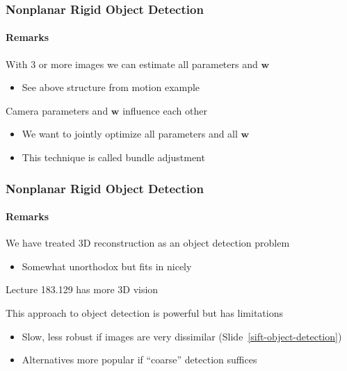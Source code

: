 \documentclass[xetex,professionalfont]{beamer}
\renewcommand{\vec}[1]{\ensuremath{\mathbf{#1}}}
\newcommand{\vw}{\vec{w}}
\renewcommand\emph[1]{\textcolor{tuwcvl_inf_red}{#1}}
\begin{document}
\begin{frame}
\frametitle{Nonplanar Rigid Object Detection}
\framesubtitle{Remarks}

With 3 or more images we can estimate all parameters and $\vw$ %
\begin{itemize}
    \item See above structure from motion example
\end{itemize}

\bigskip
Camera parameters and $\vw$ influence each other
\begin{itemize}
    \item We want to jointly optimize all parameters and all $\vw$
    \item This technique is called \emph{bundle adjustment}
\end{itemize}

\end{frame}


\begin{frame}
\frametitle{Nonplanar Rigid Object Detection}
\framesubtitle{Remarks}

We have treated 3D reconstruction as an object detection problem
\begin{itemize}
    \item Somewhat unorthodox but fits in nicely
\end{itemize}

\bigskip
Lecture 183.129 has more 3D vision

\bigskip
This approach to object detection is powerful but has limitations
\begin{itemize}
    \item Slow, less robust if images are very dissimilar (Slide~\ref{sift-object-detection})
    \item Alternatives more popular if \enquote{coarse} detection suffices %
\end{itemize}

\end{frame}


{
\begin{frame}


\end{frame}
}
\end{document}
